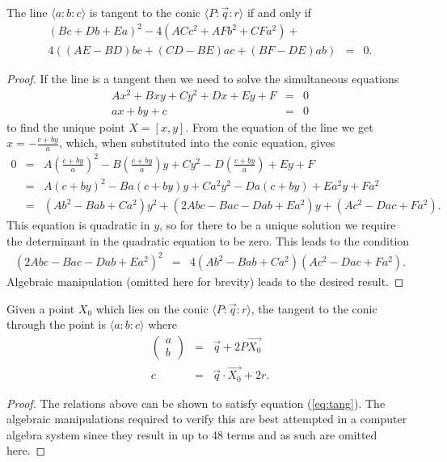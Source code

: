 \begin{theorem} The line $\langle a\!:\!b\!:\!c\rangle$ is tangent to the conic $\langle P\!:\!\vec{q}\!:\!r\rangle$ if and only if
\begin{eqnarray}
(Bc + Db + Ea)^2 -4(ACc^2 + AFb^2 + CFa^2) + & &\nonumber\\
4\left((AE - BD)bc + (CD - BE)ac  + (BF- DE)ab\right) & = & 0.\label{eq:tang}
\end{eqnarray}
\end{theorem}
\begin{proof}
If the line is a tangent then we need to solve the simultaneous equations
\begin{eqnarray*}
Ax^2 + Bxy + Cy^2 + Dx + Ey + F & = & 0\\
ax + by + c & = & 0
\end{eqnarray*}
to find the unique point $X = [x, y]$. From the equation of the line we get $x = -\frac{c + by}{a}$, which, when substituted into the conic equation, gives
\begin{eqnarray*}
0 & = & A\left(\frac{c + by}{a}\right)^2 - B\left(\frac{c + by}{a}\right)y + Cy^2 - D\left(\frac{c + by}{a}\right) + Ey + F\\
  & = & A(c + by)^2 - Ba(c + by)y + Ca^2y^2 - Da(c + by)+ Ea^2y + Fa^2\\
  & = & (Ab^2 - Bab + Ca^2)y^2 + (2Abc - Bac - Dab + Ea^2)y + (Ac^2 - Dac + Fa^2).
\end{eqnarray*}
This equation is quadratic in $y$, so for there to be a unique solution we require the determinant in the quadratic equation to be zero. This leads to the condition
\begin{eqnarray*}
(2Abc - Bac - Dab + Ea^2)^2 & = & 4(Ab^2 - Bab + Ca^2)(Ac^2 - Dac + Fa^2).
\end{eqnarray*}
Algebraic manipulation (omitted here for brevity) leads to the desired result.
\end{proof}

\begin{theorem}\label{th:tangent} Given a point $X_0$ which lies on the conic $\langle P\!:\!\vec{q}\!:\!r \rangle$, the tangent to the conic through the point is $\langle a\!:\!b\!:\!c \rangle$ where
\begin{eqnarray}
\begin{pmatrix}a \\ b\end{pmatrix} & = & \vec{q} + 2P\vec{X_0}\\
c & = & \vec{q}\cdot \vec{X_0} + 2r.
\end{eqnarray}
\end{theorem}
\begin{proof}
The relations above can be shown to satisfy equation (\ref{eq:tang}). The algebraic manipulations required to verify this are best attempted in a computer algebra system since they result in up to 48 terms and as such are omitted here.
\end{proof}

